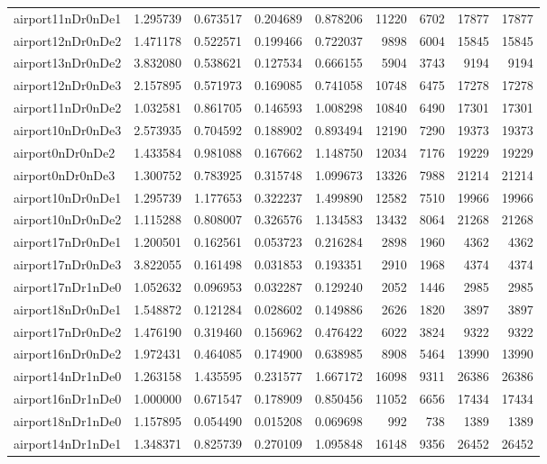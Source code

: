 \begin{longtable}{|l|r|r|r|r|r|r|r|r|}
airport11nDr0nDe1 & 1.295739 & 0.673517 & 0.204689 & 0.878206 & 11220 & 6702 & 17877 & 17877 \\
airport12nDr0nDe2 & 1.471178 & 0.522571 & 0.199466 & 0.722037 & 9898 & 6004 & 15845 & 15845 \\
airport13nDr0nDe2 & 3.832080 & 0.538621 & 0.127534 & 0.666155 & 5904 & 3743 & 9194 & 9194 \\
airport12nDr0nDe3 & 2.157895 & 0.571973 & 0.169085 & 0.741058 & 10748 & 6475 & 17278 & 17278 \\
airport11nDr0nDe2 & 1.032581 & 0.861705 & 0.146593 & 1.008298 & 10840 & 6490 & 17301 & 17301 \\
airport10nDr0nDe3 & 2.573935 & 0.704592 & 0.188902 & 0.893494 & 12190 & 7290 & 19373 & 19373 \\
airport0nDr0nDe2 & 1.433584 & 0.981088 & 0.167662 & 1.148750 & 12034 & 7176 & 19229 & 19229 \\
airport0nDr0nDe3 & 1.300752 & 0.783925 & 0.315748 & 1.099673 & 13326 & 7988 & 21214 & 21214 \\
airport10nDr0nDe1 & 1.295739 & 1.177653 & 0.322237 & 1.499890 & 12582 & 7510 & 19966 & 19966 \\
airport10nDr0nDe2 & 1.115288 & 0.808007 & 0.326576 & 1.134583 & 13432 & 8064 & 21268 & 21268 \\
airport17nDr0nDe1 & 1.200501 & 0.162561 & 0.053723 & 0.216284 & 2898 & 1960 & 4362 & 4362 \\
airport17nDr0nDe3 & 3.822055 & 0.161498 & 0.031853 & 0.193351 & 2910 & 1968 & 4374 & 4374 \\
airport17nDr1nDe0 & 1.052632 & 0.096953 & 0.032287 & 0.129240 & 2052 & 1446 & 2985 & 2985 \\
airport18nDr0nDe1 & 1.548872 & 0.121284 & 0.028602 & 0.149886 & 2626 & 1820 & 3897 & 3897 \\
airport17nDr0nDe2 & 1.476190 & 0.319460 & 0.156962 & 0.476422 & 6022 & 3824 & 9322 & 9322 \\
airport16nDr0nDe2 & 1.972431 & 0.464085 & 0.174900 & 0.638985 & 8908 & 5464 & 13990 & 13990 \\
airport14nDr1nDe0 & 1.263158 & 1.435595 & 0.231577 & 1.667172 & 16098 & 9311 & 26386 & 26386 \\
airport16nDr1nDe0 & 1.000000 & 0.671547 & 0.178909 & 0.850456 & 11052 & 6656 & 17434 & 17434 \\
airport18nDr1nDe0 & 1.157895 & 0.054490 & 0.015208 & 0.069698 & 992 & 738 & 1389 & 1389 \\
airport14nDr1nDe1 & 1.348371 & 0.825739 & 0.270109 & 1.095848 & 16148 & 9356 & 26452 & 26452 \\

\end{longtable}
